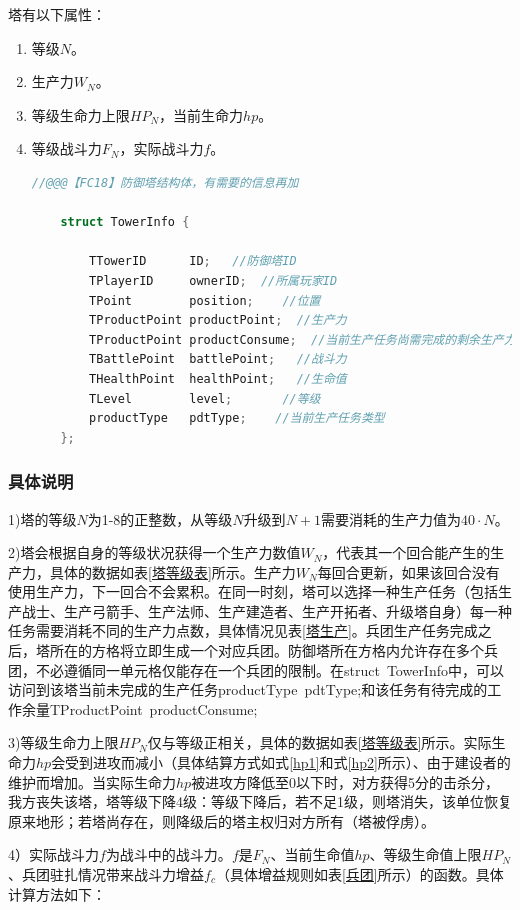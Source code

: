 \documentclass[a4paper,4pt]{article}
\begin{document}
塔有以下属性：
\begin{enumerate}[fullwidth, itemindent=2em, label=(\arabic*)]
	\item 等级$N$。
	\item 生产力$W_N$。
	\item 等级生命力上限$HP_N$，当前生命力$hp$。
	\item 等级战斗力$F_N$，实际战斗力$f$。%
	      \begin{lstlisting}[language={C++},title={防御塔结构体}]  %插入代码块
  	//@@@【FC18】防御塔结构体，有需要的信息再加
  	
  	struct TowerInfo {
  		
  		TTowerID      ID;   //防御塔ID
  		TPlayerID     ownerID;  //所属玩家ID
  		TPoint        position;    //位置
  		TProductPoint productPoint;  //生产力
  		TProductPoint productConsume;  //当前生产任务尚需完成的剩余生产力值
  		TBattlePoint  battlePoint;   //战斗力
  		THealthPoint  healthPoint;   //生命值
  		TLevel        level;       //等级
  		productType   pdtType;    //当前生产任务类型
  	};
  \end{lstlisting}

\end{enumerate}
\subsubsection{具体说明}
1)塔的等级$N$为1-8的正整数，从等级$N$升级到$N+1$需要消耗的生产力值为$40 \cdot N$。\par
2)塔会根据自身的等级状况获得一个生产力数值$W_N$，代表其一个回合能产生的生产力，具体的数据如表\ref{塔等级表}所示。生产力$W_N$每回合更新，如果该回合没有使用生产力，下一回合不会累积。在同一时刻，塔可以选择一种生产任务（包括生产战士、生产弓箭手、生产法师、生产建造者、生产开拓者、升级塔自身）每一种任务需要消耗不同的生产力点数，具体情况见表\ref{塔生产}。兵团生产任务完成之后，塔所在的方格将立即生成一个对应兵团。防御塔所在方格内允许存在多个兵团，不必遵循同一单元格仅能存在一个兵团的限制。在struct\ TowerInfo中，可以访问到该塔当前未完成的生产任务productType\ pdtType;和该任务有待完成的工作余量TProductPoint\ productConsume;\par
3)等级生命力上限$HP_N$仅与等级正相关，具体的数据如表\ref{塔等级表}所示。实际生命力$hp$会受到进攻而减小（具体结算方式如式\ref{hp1}和式\ref{hp2}所示）、由于建设者的维护而增加。当实际生命力$hp$被进攻方降低至0以下时，对方获得5分的击杀分，我方丧失该塔，塔等级下降4级：等级下降后，若不足1级，则塔消失，该单位恢复原来地形；若塔尚存在，则降级后的塔主权归对方所有（塔被俘虏）。\par
4）实际战斗力$f$为战斗中的战斗力。$f$是$F_N$、当前生命值$hp$、等级生命值上限$HP_N$、兵团驻扎情况带来战斗力增益$f_c$（具体增益规则如表\ref{兵团}所示）的函数。具体计算方法如下：
\end{document}
